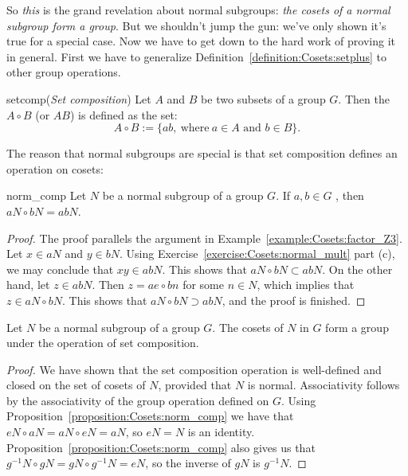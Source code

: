  So \emph{this} is the grand revelation about normal subgroups: \emph{the cosets of a normal subgroup form a group}. But we shouldn't jump the gun: we've only shown it's true for a special case. Now we have to get down to the hard work of proving it in general. First we have to generalize Definition~\ref{definition:Cosets:setplus} to other group operations.

\begin{defn}{setcomp}(\emph{Set composition})  Let $A$ and $B$ be two subsets of a group $G$.  Then the  $A \circ B$ (or $AB$)  is defined as the set:
\[ A \circ B := \{a b, \mathrm{~where~} a \in A \text{ and } b \in B\} .\]
\end{defn}

The reason that normal subgroups are special is that set composition defines an operation on cosets:

\begin{prop}{norm_comp}
Let $N$ be a normal subgroup of a group $G$. If $a,b \in G$ , then $aN \circ bN = abN$.
\end{prop}
\begin{proof}
The proof parallels the argument in Example~\ref{example:Cosets:factor_Z3}. Let $x \in aN$ and $y \in bN$. 
Using Exercise~\ref{exercise:Cosets:normal_mult} part (c), we may conclude that $xy \in abN$.  This shows that $aN \circ bN \subset abN$.  On the other hand,
let $z \in abN$.  Then $z = ae \circ b  n$ for some $n\in N$, which implies that $z \in aN \circ bN$.  This shows that $aN \circ bN \supset abN$, and the proof is finished.
\end{proof}

\begin{prop}{}
Let $N$ be a normal subgroup of a group $G$. The cosets of $N$ in $G$
form a group under the operation of set composition. 
\end{prop}
  
\begin{proof}
We have shown that the set composition operation is well-defined and closed on the set of cosets of $N$, provided that $N$ is normal. 
Associativity follows by the associativity of the group operation defined on $G$.
Using Proposition~\ref{proposition:Cosets:norm_comp} we have that $eN \circ aN = aN \circ eN = aN$, so $eN = N$ is an identity.  
Proposition~\ref{proposition:Cosets:norm_comp} also gives us that $g^{-1}N \circ gN = gN \circ g^{-1}N = eN$, so the inverse of $gN$ is $g^{-1} N$. 
\end{proof}


